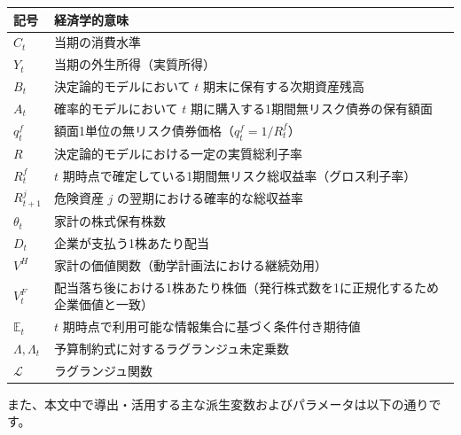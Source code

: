 \documentclass[
  japanese,
  lualatex,
  ja=standard,
  12pt,
  a4paper]{ltjsarticle}
\newcounter{none} %
\begin{document}
{\def\LTcaptype{none} %
\begin{longtable}[]{@{}
  >{\raggedright\arraybackslash}p{}
  >{\raggedright\arraybackslash}p{}@{}}
\toprule\noalign{}
\begin{minipage}[b]{\linewidth}\raggedright
記号
\end{minipage} & \begin{minipage}[b]{\linewidth}\raggedright
経済学的意味
\end{minipage} \\
\midrule\noalign{}
\endhead
\bottomrule\noalign{}
\endlastfoot
\(C_t\) & 当期の消費水準 \\
\(Y_t\) & 当期の外生所得（実質所得） \\
\(B_t\) & 決定論的モデルにおいて \(t\) 期末に保有する次期資産残高 \\
\(A_t\) & 確率的モデルにおいて \(t\)
期に購入する1期間無リスク債券の保有額面 \\
\(q_t^f\) & 額面1単位の無リスク債券価格（\(q_t^f = 1/R_t^f\)） \\
\(R\) & 決定論的モデルにおける一定の実質総利子率 \\
\(R_t^f\) & \(t\)
期時点で確定している1期間無リスク総収益率（グロス利子率） \\
\(R^j_{t+1}\) & 危険資産 \(j\) の翌期における確率的な総収益率 \\
\(\theta_t\) & 家計の株式保有株数 \\
\(D_t\) & 企業が支払う1株あたり配当 \\
\(V^H\) & 家計の価値関数（動学計画法における継続効用） \\
\(V_t^F\) &
配当落ち後における1株あたり株価（発行株式数を1に正規化するため企業価値と一致） \\
\(\mathbb{E}_t\) & \(t\)
期時点で利用可能な情報集合に基づく条件付き期待値 \\
\(\Lambda, \Lambda_t\) & 予算制約式に対するラグランジュ未定乗数 \\
\(\mathcal{L}\) & ラグランジュ関数 \\
\end{longtable}
}

また、本文中で導出・活用する主な派生変数およびパラメータは以下の通りです。
\end{document}
